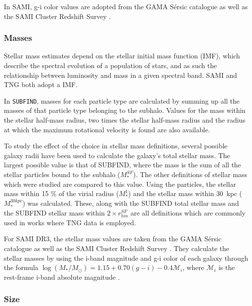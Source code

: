 In SAMI, g-i color values are adopted from the GAMA Sérsic catalogue \parencite{Driver2011} as well as the SAMI Cluster Redshift Survey \parencite{Owers2017}.

\subsubsection{Masses}

Stellar mass estimates depend on the stellar initial mass function (IMF), which describe the spectral evolution of a population of stars, and as such the relationship between luminosity and mass in a given spectral band. SAMI and TNG both adopt a \textcite{Chabrier2003} IMF.

In \texttt{SUBFIND}, masses for each particle type are calculated by summing up all the masses of that particle type belonging to the subhalo. Values for the mass within the stellar half-mass radius, two times the stellar half-mass radius and the radius at which the maximum rotational velocity is found are also available.

To study the effect of the choice in stellar mass definitions, several possible galaxy radii have been used to calculate the galaxy's total stellar mass. The largest possible value is that of SUBFIND, where the mass is the sum of all the stellar particles bound to the subhalo ($M^{SF}_\ast$). The other definitions of stellar mass which were studied are compared to this value. Using the particles, the stellar mass within 15 \% of the virial radius ($M_\ast^1$) and the stellar mass within 30$\,$ kpc ($M_\ast^{30kpc}$) was calculated. These, along with the SUBFIND total stellar mass and the SUBFIND stellar mass within $2 \times r_{hm}^{SF}$ are all definitions which are commonly used in works where TNG data is employed. 

For SAMI DR3, the stellar mass values are taken from the GAMA Sérsic catalogue \parencite{Driver2011} as well as the SAMI Cluster Redshift Survey \parencite{Owers2017}. They calculate the stellar masses by using the i-band magnitude and g-i color of each galaxy through the formula $\log(M_*/M_\odot) = 1.15 + 0.70(g-i) -0.4\mathcal{M}_i$, where $\mathcal{M}_i$ is the rest-frame i-band absolute magnitude \parencite{Taylor2011}.

\subsubsection{Size}

